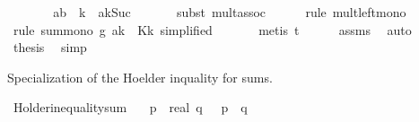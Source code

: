 \begin{isabellebody}
\ \ \isamarkupfalse%
\ \isamarkupfalse%
\ {\isachardoublequoteopen}{\isachardot}{\kern0pt}{\isachardot}{\kern0pt}{\isachardot}{\kern0pt}\ {\isasymle}\ {\isacharparenleft}{\kern0pt}a{\isacharminus}{\kern0pt}b{\isacharparenright}{\kern0pt}\ {\isacharasterisk}{\kern0pt}\ k\ {\isacharasterisk}{\kern0pt}\ a{\isacharcircum}{\kern0pt}{\isacharparenleft}{\kern0pt}k{\isacharminus}{\kern0pt}Suc\ {}{\isacharparenright}{\kern0pt}{\isachardoublequoteclose}\isanewline
\ \ \ \ \isamarkupfalse%
\ {\isacharparenleft}{\kern0pt}subst\ mult{\isachardot}{\kern0pt}assoc{\isacharparenright}{\kern0pt}\isanewline
\ \ \ \ \isamarkupfalse%
\ {\isacharparenleft}{\kern0pt}rule\ mult{\isacharunderscore}{\kern0pt}left{\isacharunderscore}{\kern0pt}mono{\isacharparenright}{\kern0pt}\isanewline
\ \ \ \ \ \isamarkupfalse%
\ {\isacharparenleft}{\kern0pt}rule\ sum{\isacharunderscore}{\kern0pt}mono{\isacharbrackleft}{\kern0pt}\ g{\isacharequal}{\kern0pt}{\isachardoublequoteopen}{\isasymlambda}{\isacharunderscore}{\kern0pt}{\isachardot}{\kern0pt}\ a{\isacharcircum}{\kern0pt}{\isacharparenleft}{\kern0pt}k{\isacharminus}{\kern0pt}{}{\isacharparenright}{\kern0pt}{\isachardoublequoteclose}\ \ K{\isacharequal}{\kern0pt}{\isachardoublequoteopen}{\isacharbraceleft}{\kern0pt}{}{\isachardot}{\kern0pt}{\isachardot}{\kern0pt}{\isacharless}{\kern0pt}k{\isacharbraceright}{\kern0pt}{\isachardoublequoteclose}{\isacharcomma}{\kern0pt}\ simplified{\isacharbrackright}{\kern0pt}{\isacharparenright}{\kern0pt}\isanewline
\ \ \ \ \ \isamarkupfalse%
\ {\isacharparenleft}{\kern0pt}metis\ t{\isacharparenright}{\kern0pt}\isanewline
\ \ \ \ \isamarkupfalse%
\ assms{\isacharparenleft}{\kern0pt}{}{\isacharparenright}{\kern0pt}\ \isamarkupfalse%
\ auto\isanewline
\ \ \isamarkupfalse%
\ \isamarkupfalse%
\ {\isacharquery}{\kern0pt}thesis\ \isamarkupfalse%
\ simp\isanewline
{}\isamarkupfalse%
%
\endisatagproof
{\isafoldproof}%
%
\isadelimproof
%
\endisadelimproof
%
\begin{isamarkuptext}%
Specialization of the Hoelder inquality for sums.%
\end{isamarkuptext}\isamarkuptrue%
\isamarkupfalse%
\ Holder{\isacharunderscore}{\kern0pt}inequality{\isacharunderscore}{\kern0pt}sum{\isacharcolon}{\kern0pt}\isanewline
\ \ \ {\isachardoublequoteopen}p\ {\isachargreater}{\kern0pt}\ {\isacharparenleft}{\kern0pt}{}{\isacharcolon}{\kern0pt}{\isacharcolon}{\kern0pt}real{\isacharparenright}{\kern0pt}{\isachardoublequoteclose}\ {\isachardoublequoteopen}q\ {\isachargreater}{\kern0pt}\ {}{\isachardoublequoteclose}\ {\isachardoublequoteopen}{}{\isacharslash}{\kern0pt}p\ {\isacharplus}{\kern0pt}\ {}{\isacharslash}{\kern0pt}q\ {\isacharequal}{\kern0pt}\ {}{\isachardoublequoteclose}\isanewline

\end{isabellebody}
